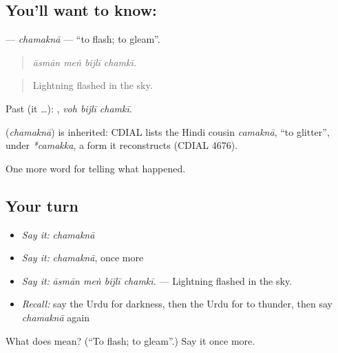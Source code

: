\subsection*{You'll want to know: }
\textbf{} — \emph{chamaknā} — \textquotedblleft{}to flash; to gleam\textquotedblright{}.

\begin{quote}
   
\end{quote}

\begin{quote}
\emph{āsmān meṅ bijlī chamkī.}
\end{quote}

\begin{quote}
Lightning flashed in the sky.
\end{quote}

Past (it …):   , \emph{voh bijlī chamkī}.

\begin{cousinweb}
\textbf{} (\emph{chamaknā}) is inherited: CDIAL lists the Hindi cousin \emph{camaknā}, \textquotedblleft{}to glitter\textquotedblright{}, under \emph{*camakka}, a form it reconstructs (CDIAL 4676).
\end{cousinweb}

\begin{grammarlens}[title={What you've built}]
One more word for telling what happened.
\end{grammarlens}

\subsection*{Your turn}
\begin{itemize}
\raggedright
  \item \emph{Say it:} \emph{chamaknā}
  \item \emph{Say it:} \emph{chamaknā}, once more
  \item \emph{Say it:} \emph{āsmān meṅ bijlī chamkī.} — Lightning flashed in the sky.
  \item \emph{Recall:} say the Urdu for darkness, then the Urdu for to thunder, then say \emph{chamaknā} again
\end{itemize}

\begin{tcolorbox}[breakable,colback=teal!4,colframe=teal!35!black,title={Before you move on}]
What does  mean? (\textquotedblleft{}To flash; to gleam\textquotedblright{}.) Say it once more.
\end{tcolorbox}
